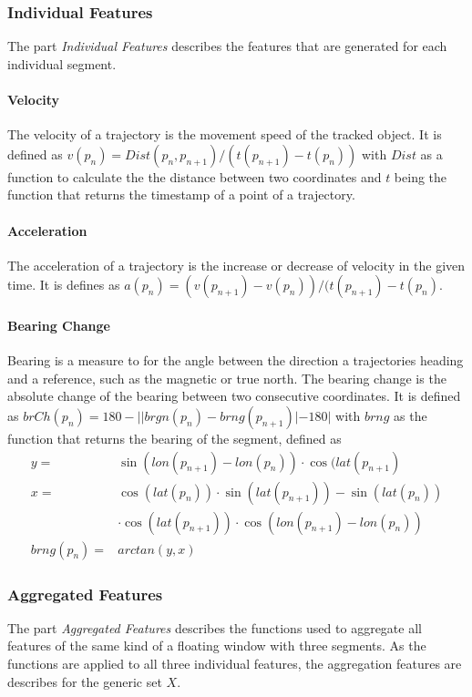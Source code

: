 \subsubsection{Individual Features}
The part \textit{Individual Features} describes the features that are generated for each individual segment. 

\paragraph{Velocity} The velocity of a trajectory is the movement speed of the tracked object. It is defined as $v(p_n) = Dist(p_n, p_{n+1})/(t(p_{n+1}) - t(p_n))$ with $Dist$ as a function to calculate the the distance between two coordinates and $t$ being the function that returns the timestamp of a point of a trajectory. \cite{Zheng2008}

\paragraph{Acceleration} The acceleration of a trajectory is the increase or decrease of velocity in the given time. It is defines as $ a(p_n) = (v(p_{n+1}) - v(p_n))/(t(p_{n+1}) - t(p_n)$. \cite{Zheng2008}

\paragraph{Bearing Change} Bearing is a measure to for the angle between the direction a trajectories heading and a reference, such as the magnetic or true north. The bearing change is the absolute change of the bearing between two consecutive coordinates. It is defined as $ brCh(p_n) = 180 - | |brgn(p_n) - brng(p_{n+1})
| - 180| $ with $brng$ as the function that returns the bearing of the segment, defined as 
\begin{align*}
            y =& \sin (lon(p_{n+1})-lon(p_n)) \cdot \cos(lat(p_{n+1}) \\ 
            x =& \cos (lat(p_n)) \cdot \sin (lat(p_{n+1}))-\sin (lat(p_n))\\
               & \cdot \cos (lat(p_{n+1})) \cdot \cos(lon(p_{n+1})-lon(p_n)) \\
    brng(p_n) =& arctan(y,x)
\end{align*} \cite{Dabiri2018}

\subsubsection{Aggregated Features}
The part \textit{Aggregated Features} describes the functions used to aggregate all features of the same kind of a floating window with three segments. As the functions are applied to all three individual features, the aggregation features are describes for the generic set $X$.

